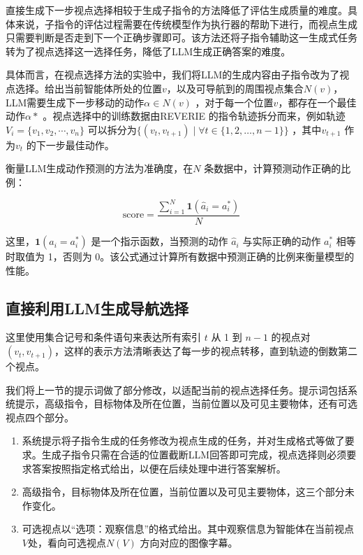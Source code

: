 \documentclass[bachelor]{thesis-uestc}
\begin{document}
直接生成下一步视点选择相较于生成子指令的方法降低了评估生成质量的难度。具体来说，子指令的评估过程需要在传统模型作为执行器的帮助下进行，而视点生成只需要判断是否走到下一个正确步骤即可。该方法还将子指令辅助这一生成式任务转为了视点选择这一选择任务，降低了LLM生成正确答案的难度。

具体而言，在视点选择方法的实验中，我们将LLM的生成内容由子指令改为了视点选择。给出当前智能体所处的位置$v$，以及可导航到的周围视点集合$N(v)$，LLM需要生成下一步移动的动作$\alpha \in N(v)$ ，对于每一个位置$v$，都存在一个最佳动作$\alpha*$ 。视点选择中的训练数据由REVERIE 的指令轨迹拆分而来，例如轨迹 $V_i=\{v_1,v_2,\cdots,v_n\}$ 可以拆分为$\{(v_t, v_{t+1}) \mid \forall t \in \{1, 2, \dots, n-1\}\}$ ，其中$v_{t+1}$ 作为$v_t$ 的下一步最佳动作。

衡量LLM生成动作预测的方法为准确度，在$N$ 条数据中，计算预测动作正确的比例：

\[
\text{score} = \frac{\sum_{i=1}^N \mathbf{1}(\hat{a}_i = a^*_i)}{N}
\]

这里，$\mathbf{1}(\hat{a}_i = a^*_i)$ 是一个指示函数，当预测的动作 $\hat{a}_i$ 与实际正确的动作 $a^*_i$ 相等时取值为 1，否则为 0。该公式通过计算所有数据中预测正确的比例来衡量模型的性能。


\subsection{直接利用LLM生成导航选择}

这里使用集合记号和条件语句来表达所有索引 \( t \) 从 1 到 \( n-1 \) 的视点对 \( (v_t, v_{t+1}) \)，这样的表示方法清晰表达了每一步的视点转移，直到轨迹的倒数第二个视点。

我们将上一节的提示词做了部分修改，以适配当前的视点选择任务。提示词包括系统提示，高级指令，目标物体及所在位置，当前位置以及可见主要物体，还有可选视点四个部分。

\begin{enumerate}
    \item 系统提示将子指令生成的任务修改为视点生成的任务，并对生成格式等做了要求。生成子指令只需在合适的位置截断LLM回答即可完成，视点选择则必须要求答案按照指定格式给出，以便在后续处理中进行答案解析。
    \item 高级指令，目标物体及所在位置，当前位置以及可见主要物体，这三个部分未作变化。
    \item 可选视点以“选项：观察信息”的格式给出。其中观察信息为智能体在当前视点$V$处，看向可选视点$N(V)$ 方向对应的图像字幕。
\end{enumerate}
\end{document}
